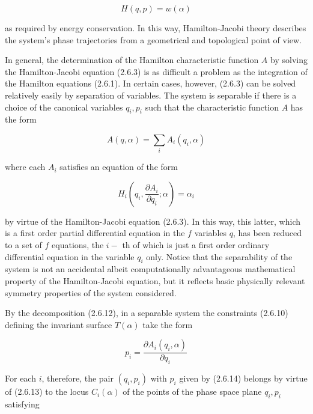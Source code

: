 \documentclass{article}
\begin{document}
\begin{equation*}
H(q, p)=w(\alpha) \tag{2.6.11}
\end{equation*}
 
as required by energy conservation. In this way, Hamilton-Jacobi theory describes the system's phase trajectories from a geometrical and topological point of view.

In general, the determination of the Hamilton characteristic function $A$ by solving the Hamilton-Jacobi equation (2.6.3) is as difficult a problem as the integration of the Hamilton equations (2.6.1). In certain cases, however, (2.6.3) can be solved relatively easily by separation of variables. The system is separable if there is a choice of the canonical variables $q_{i}, p_{i}$ such that the characteristic function $A$ has the form
 
\begin{equation*}
A(q, \alpha)=\sum_{i} A_{i}\left(q_{i}, \alpha\right) \tag{2.6.12}
\end{equation*}
 
where each $A_{i}$ satisfies an equation of the form
 
\begin{equation*}
H_{i}\left(q_{i}, \frac{\partial A_{i}}{\partial q_{i}} ; \alpha\right)=\alpha_{i} \tag{2.6.13}
\end{equation*}
 
by virtue of the Hamilton-Jacobi equation (2.6.3). In this way, this latter, which is a first order partial differential equation in the $f$ variables $q$, has been reduced to a set of $f$ equations, the $i-$ th of which is just a first order ordinary differential equation in the variable $q_{i}$ only. Notice that the separability of the system is not an accidental albeit computationally advantageous mathematical property of the Hamilton-Jacobi equation, but it reflects basic physically relevant symmetry properties of the system considered.

By the decomposition (2.6.12), in a separable system the constraints (2.6.10) defining the invariant surface $T(\alpha)$ take the form
 
\begin{equation*}
p_{i}=\frac{\partial A_{i}\left(q_{i}, \alpha\right)}{\partial q_{i}} \tag{2.6.14}
\end{equation*}
 

For each $i$, therefore, the pair $\left(q_{i}, p_{i}\right)$ with $p_{i}$ given by (2.6.14) belongs by virtue of (2.6.13) to the locus $C_{i}(\alpha)$ of the points of the phase space plane $q_{i}, p_{i}$ satisfying
\end{document}
